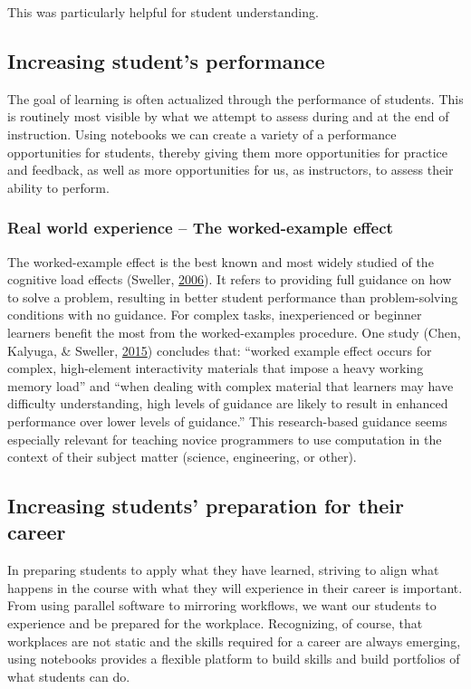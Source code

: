 \documentclass[]{book}
\begin{document}
This was particularly helpful for student understanding.

\subsection{Increasing student's
performance}\label{increasing-students-performance}

The goal of learning is often actualized through the performance of
students. This is routinely most visible by what we attempt to assess
during and at the end of instruction. Using notebooks we can create a
variety of a performance opportunities for students, thereby giving them
more opportunities for practice and feedback, as well as more
opportunities for us, as instructors, to assess their ability to
perform.

\subsubsection{Real world experience -- The worked-example
effect}\label{real-world-experience-the-worked-example-effect}

The worked-example effect is the best known and most widely studied of
the cognitive load effects (Sweller,
\protect\hyperlink{ref-sweller2006worked}{2006}). It refers to providing
full guidance on how to solve a problem, resulting in better student
performance than problem-solving conditions with no guidance. For
complex tasks, inexperienced or beginner learners benefit the most from
the worked-examples procedure. One study (Chen, Kalyuga, \& Sweller,
\protect\hyperlink{ref-chen2015worked}{2015}) concludes that: ``worked
example effect occurs for complex, high-element interactivity materials
that impose a heavy working memory load'' and ``when dealing with
complex material that learners may have difficulty understanding, high
levels of guidance are likely to result in enhanced performance over
lower levels of guidance.'' This research-based guidance seems
especially relevant for teaching novice programmers to use computation
in the context of their subject matter (science, engineering, or other).

\subsection{Increasing students' preparation for their
career}\label{increasing-students-preparation-for-their-career}

In preparing students to apply what they have learned, striving to align
what happens in the course with what they will experience in their
career is important. From using parallel software to mirroring
workflows, we want our students to experience and be prepared for the
workplace. Recognizing, of course, that workplaces are not static and
the skills required for a career are always emerging, using notebooks
provides a flexible platform to build skills and build portfolios of
what students can do.
\end{document}
